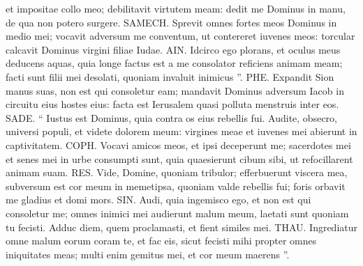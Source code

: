 \begin{biblechapter}
 et impositae collo meo;
 debilitavit virtutem meam:
 dedit me Dominus in manu,
 de qua non potero surgere.
 \verse SAMECH. Sprevit omnes fortes meos
 Dominus in medio mei;
 vocavit adversum me conventum,
 ut contereret iuvenes meos:
 torcular calcavit Dominus
 virgini filiae Iudae.
 \verse AIN. Idcirco ego plorans,
 et oculus meus deducens aquas,
 quia longe factus est a me consolator
 reficiens animam meam;
 facti sunt filii mei desolati,
 quoniam invaluit inimicus ”.
 \verse PHE. Expandit Sion manus suas,
 non est qui consoletur eam;
 mandavit Dominus adversum Iacob
 in circuitu eius hostes eius:
 facta est Ierusalem
 quasi polluta menstruis inter eos.
 \verse SADE. “ Iustus est Dominus,
 quia contra os eius rebellis fui.
 Audite, obsecro, universi populi,
 et videte dolorem meum:
 virgines meae et iuvenes mei
 abierunt in captivitatem.
 \verse COPH. Vocavi amicos meos,
 et ipsi deceperunt me;
 sacerdotes mei et senes mei
 in urbe consumpti sunt,
 quia quaesierunt cibum sibi,
 ut refocillarent animam suam.
 \verse RES. Vide, Domine, quoniam tribulor;
 efferbuerunt viscera mea,
 subversum est cor meum in memetipsa,
 quoniam valde rebellis fui;
 foris orbavit me gladius
 et domi mors.
 \verse SIN. Audi, quia ingemisco ego,
 et non est qui consoletur me;
 omnes inimici mei audierunt malum meum,
 laetati sunt quoniam tu fecisti.
 Adduc diem, quem proclamasti,
 et fient similes mei.
 \verse THAU. Ingrediatur omne malum eorum coram te,
 et fac eis,
 sicut fecisti mihi
 propter omnes iniquitates meas;
 multi enim gemitus mei,
 et cor meum maerens ”.
 

\end{biblechapter}
